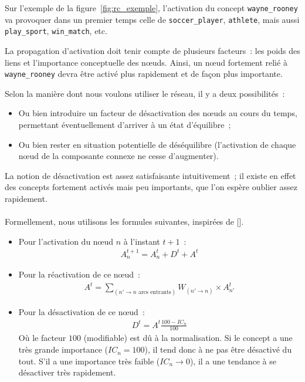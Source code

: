 \documentclass[a4paper, 12pt]{article}
\begin{document}
Sur l'exemple de la figure~\ref{fig:rc_exemple}, l'activation du concept \verb|wayne_rooney| va provoquer dans un premier temps celle de \verb|soccer_player|, \verb|athlete|, mais aussi \verb|play_sport|, \verb|win_match|, etc.

La propagation d'activation doit tenir compte de plusieurs facteurs~: les poids des liens et l'importance conceptuelle des n\oe{}uds. Ainsi, un n\oe{}ud fortement relié à \verb|wayne_rooney| devra être activé plus rapidement et de façon plus importante.

Selon la manière dont nous voulons utiliser le réseau, il y a deux possibilités~:
\begin{itemize}
  \item Ou bien introduire un facteur de désactivation des n\oe{}uds au cours du temps, permettant éventuellement d'arriver à un état d'équilibre~;
 \item Ou bien rester en situation potentielle de déséquilibre (l'activation de chaque n\oe{}ud de la composante connexe ne cesse d'augmenter).
\end{itemize}

La notion de désactivation est assez satisfaisante intuitivement~; il existe en effet des concepts fortement activés mais peu importants, que l'on espère oublier assez rapidement. 

\paragraph{}
Formellement, nous utilisons les formules suivantes, inspirées de [].

\begin{itemize}
  \item Pour l'activation du n\oe{}ud $n$ à l'instant $t+1$~:
\begin{align}
 A_n^{t+1} = A_n^t + D^t + A^t
\end{align}
\item Pour la réactivation de ce n\oe{}ud~:
\begin{align}
 A^t = \sum_{(n' \rightarrow n \text{\ arcs entrants})} W_{(n'\rightarrow  n)} \times A_{n'}^t
\end{align}
\item Pour la désactivation de ce n\oe{}ud~:
\begin{align}
 D^t = A^t \frac{100- IC_n}{100}
\end{align}
Où le facteur $100$ (modifiable) est dû à la normalisation. Si le concept a une très grande importance ($IC_n = 100$), il tend donc à ne pas être désactivé du tout. S'il a une importance très faible ($IC_n \rightarrow 0$), il a une tendance à se désactiver très rapidement.
\end{itemize}
\end{document}
